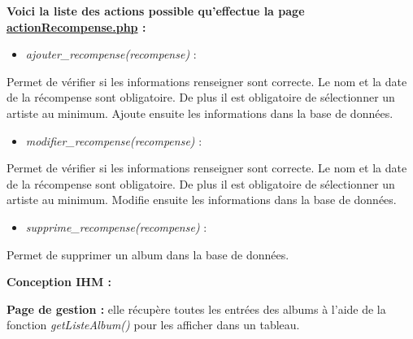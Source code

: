 			\begin{paragraphe}
                \textbf{Voici la liste des actions possible qu'effectue la page \underline{actionRecompense.php} :}
            
                \begin{itemize}
                    \item \emph{ajouter\_recompense(recompense)} :
                \end{itemize}
                \begin{paragraphe}
                    Permet de vérifier si les informations renseigner sont correcte. Le nom et la date de la récompense sont obligatoire. De plus il est obligatoire de sélectionner un artiste au minimum. Ajoute ensuite les informations dans la base de données.
                \end{paragraphe}
                
                \begin{itemize}
                    \item \emph{modifier\_recompense(recompense)} :
                \end{itemize}
                \begin{paragraphe}
                    Permet de vérifier si les informations renseigner sont correcte. Le nom et la date de la récompense sont obligatoire. De plus il est obligatoire de sélectionner un artiste au minimum. Modifie ensuite les informations dans la base de données.
                \end{paragraphe}
                
                \begin{itemize}
                    \item \emph{supprime\_recompense(recompense)} :
                \end{itemize}
                \begin{paragraphe}
                    Permet de supprimer un album dans la base de données.
                \end{paragraphe}
            \end{paragraphe}

			\begin{paragraphe}
				\textbf{Conception IHM :}
			\end{paragraphe}
            
            \begin{paragraphe}
                \textbf{Page de gestion :} elle récupère toutes les entrées des albums à l'aide de la fonction \emph{getListeAlbum()} pour les afficher dans un tableau.
            \end{paragraphe}

